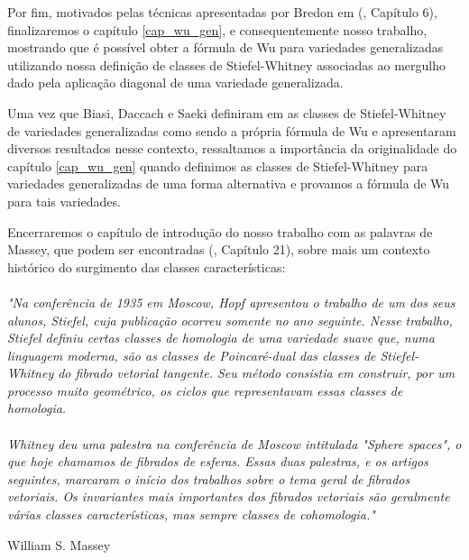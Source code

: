 \documentclass[12pt,oneside]{book} %
\begin{document}
\par Por fim, motivados pelas técnicas apresentadas por Bredon em (\cite{bredon}, Capítulo 6), finalizaremos o capítulo \ref{cap_wu_gen}, e consequentemente nosso trabalho, mostrando que é possível obter a fórmula de Wu para variedades generalizadas utilizando nossa definição de classes de Stiefel-Whitney associadas ao mergulho dado pela aplicação diagonal de uma variedade generalizada.

\par Uma vez que Biasi, Daccach e Saeki definiram em \cite{biasi} as classes de Stiefel-Whitney de variedades generalizadas como sendo a própria fórmula de Wu e apresentaram diversos resultados nesse contexto, ressaltamos a importância da originalidade do capítulo \ref{cap_wu_gen} quando definimos as classes de Stiefel-Whitney para variedades generalizadas de uma forma alternativa e provamos a fórmula de Wu para tais variedades.

\par Encerraremos o capítulo de introdução do nosso trabalho com as palavras de Massey, que podem ser encontradas (\cite{james}, Capítulo 21), sobre mais um contexto histórico do surgimento das classes características:

\begin{center}
	\begin{minipage}{12cm}
		\paragraph{     } \textit{"Na conferência de 1935 em Moscow, Hopf apresentou o trabalho de um dos seus alunos, Stiefel, cuja publicação ocorreu somente no ano seguinte. Nesse trabalho, Stiefel definiu certas classes de homologia de uma variedade suave que, numa linguagem moderna, são as classes de Poincaré-dual das classes de Stiefel-Whitney do fibrado vetorial tangente. Seu método consistia em construir, por um processo muito geométrico, os ciclos que representavam essas classes de homologia.}
	\end{minipage}
\end{center}
	
\vspace{0.5cm}
	
\begin{center}
	\begin{minipage}{12cm}
		\paragraph{     } \textit{Whitney deu uma palestra na conferência de Moscow intitulada "Sphere spaces", o que hoje chamamos de fibrados de esferas. Essas duas palestras, e os artigos seguintes, marcaram o início dos trabalhos sobre o tema geral de fibrados vetoriais. Os invariantes mais importantes dos fibrados vetoriais são geralmente várias classes características, mas sempre classes de cohomologia."}
		\begin{flushright}
			William S. Massey
		\end{flushright}
	\end{minipage}
\end{center}
\end{document}
